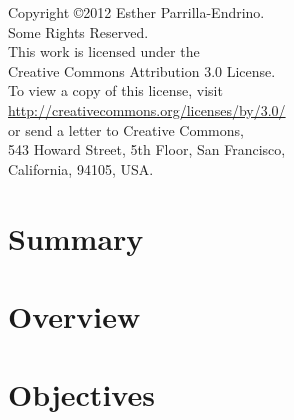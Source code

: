 \documentclass[a4paper,12pt]{book}
\begin{document}
\newpage
\thispagestyle{empty}
\vspace{5cm}
\begin{flushright}
\begin{large}
Copyright \copyright 2012 Esther Parrilla-Endrino.\\
Some Rights Reserved.\\
This work is licensed under the\\
Creative Commons Attribution 3.0 License.\\
To view a copy of this license, visit\\
\url{http://creativecommons.org/licenses/by/3.0/}\\
or send a letter to Creative Commons,\\
543 Howard Street, 5th Floor, San Francisco,\\
California, 94105, USA.\\
\end{large}
\end{flushright}


\newpage


\tableofcontents  %

\listoffigures  %

\listoftables %


\renewcommand{\refname}{Bibliography}
\addtolength{\parskip}{\baselineskip}


\chapter*{Summary}
\label{chap:summary}


\chapter{Overview}
\label{chap:overview}


\chapter{Objectives}
\label{chap:objectives}
\end{document}
